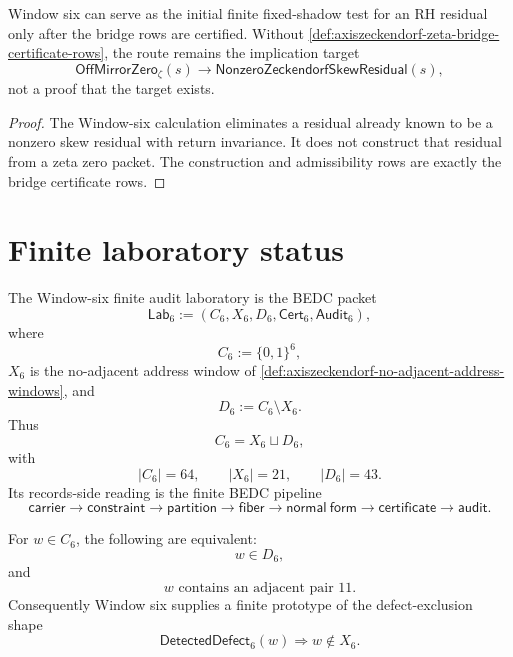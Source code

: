 \begin{corollary}
\label{cor:axiszeckendorf-bridge-obstruction-window-six-rh-proof}
Window six can serve as the initial finite fixed-shadow test for an RH
residual only after the bridge rows are certified.  Without
\autoref{def:axiszeckendorf-zeta-bridge-certificate-rows}, the route remains
the implication target
$$
\mathsf{OffMirrorZero}_{\zeta}(s)
\to
\mathsf{NonzeroZeckendorfSkewResidual}(s),
$$
not a proof that the target exists.
\end{corollary}

\begin{proof}
The Window-six calculation eliminates a residual already known to be a
nonzero skew residual with return invariance.  It does not construct that
residual from a zeta zero packet.  The construction and admissibility rows
are exactly the bridge certificate rows.
\end{proof}

\section{Finite laboratory status}
\label{sec:axiszeckendorf-window-six-finite-laboratory-status}

\begin{definition}
\label{def:axiszeckendorf-window-six-finite-audit-laboratory}
The Window-six finite audit laboratory is the BEDC packet
$$
\mathsf{Lab}_6
:=
(C_6,X_6,D_6,\mathsf{Cert}_6,\mathsf{Audit}_6),
$$
where
$$
C_6:=\{0,1\}^6,
$$
$X_6$ is the no-adjacent address window of
\autoref{def:axiszeckendorf-no-adjacent-address-windows}, and
$$
D_6:=C_6\setminus X_6.
$$
Thus
$$
C_6=X_6\sqcup D_6,
$$
with
$$
|C_6|=64,\qquad |X_6|=21,\qquad |D_6|=43.
$$
Its records-side reading is the finite BEDC pipeline
$$
\mathsf{carrier}
\to
\mathsf{constraint}
\to
\mathsf{partition}
\to
\mathsf{fiber}
\to
\mathsf{normal\ form}
\to
\mathsf{certificate}
\to
\mathsf{audit}.
$$
\end{definition}

\begin{proposition}
\label{prop:axiszeckendorf-window-six-finite-defect-prototype}
For $w\in C_6$, the following are equivalent:
$$
w\in D_6,
$$
and
$$
\text{$w$ contains an adjacent pair }11.
$$
Consequently Window six supplies a finite prototype of the defect-exclusion
shape
$$
\mathsf{DetectedDefect}_6(w)
\Longrightarrow
w\notin X_6.
$$
\end{proposition}

